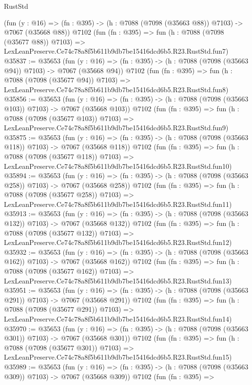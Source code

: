 \begin{lexlean}{RustStd}
\begin{coremodule}
    (fun (y : @16) => (fn : @395) -> (h : @7088 (@7098 (@35663 @88)) @7103) -> @7067 (@35668 @88))
    @7102
    (fun (fn : @395) =>
    fun (h : @7088 (@7098 (@35677 @88)) @7103) =>
    LexLeanPreserve.Ce74c78a8f5b611b9db7be15416dcd6b5.R23.RustStd.fun7)
@35837 := @35653
    (fun (y : @16) => (fn : @395) -> (h : @7088 (@7098 (@35663 @94)) @7103) -> @7067 (@35668 @94))
    @7102
    (fun (fn : @395) =>
    fun (h : @7088 (@7098 (@35677 @94)) @7103) =>
    LexLeanPreserve.Ce74c78a8f5b611b9db7be15416dcd6b5.R23.RustStd.fun8)
@35856 := @35653
    (fun (y : @16) => (fn : @395) -> (h : @7088 (@7098 (@35663 @103)) @7103) -> @7067 (@35668 @103))
    @7102
    (fun (fn : @395) =>
    fun (h : @7088 (@7098 (@35677 @103)) @7103) =>
    LexLeanPreserve.Ce74c78a8f5b611b9db7be15416dcd6b5.R23.RustStd.fun9)
@35875 := @35653
    (fun (y : @16) => (fn : @395) -> (h : @7088 (@7098 (@35663 @118)) @7103) -> @7067 (@35668 @118))
    @7102
    (fun (fn : @395) =>
    fun (h : @7088 (@7098 (@35677 @118)) @7103) =>
    LexLeanPreserve.Ce74c78a8f5b611b9db7be15416dcd6b5.R23.RustStd.fun10)
@35894 := @35653
    (fun (y : @16) => (fn : @395) -> (h : @7088 (@7098 (@35663 @258)) @7103) -> @7067 (@35668 @258))
    @7102
    (fun (fn : @395) =>
    fun (h : @7088 (@7098 (@35677 @258)) @7103) =>
    LexLeanPreserve.Ce74c78a8f5b611b9db7be15416dcd6b5.R23.RustStd.fun11)
@35913 := @35653
    (fun (y : @16) => (fn : @395) -> (h : @7088 (@7098 (@35663 @132)) @7103) -> @7067 (@35668 @132))
    @7102
    (fun (fn : @395) =>
    fun (h : @7088 (@7098 (@35677 @132)) @7103) =>
    LexLeanPreserve.Ce74c78a8f5b611b9db7be15416dcd6b5.R23.RustStd.fun12)
@35932 := @35653
    (fun (y : @16) => (fn : @395) -> (h : @7088 (@7098 (@35663 @162)) @7103) -> @7067 (@35668 @162))
    @7102
    (fun (fn : @395) =>
    fun (h : @7088 (@7098 (@35677 @162)) @7103) =>
    LexLeanPreserve.Ce74c78a8f5b611b9db7be15416dcd6b5.R23.RustStd.fun13)
@35951 := @35653
    (fun (y : @16) => (fn : @395) -> (h : @7088 (@7098 (@35663 @291)) @7103) -> @7067 (@35668 @291))
    @7102
    (fun (fn : @395) =>
    fun (h : @7088 (@7098 (@35677 @291)) @7103) =>
    LexLeanPreserve.Ce74c78a8f5b611b9db7be15416dcd6b5.R23.RustStd.fun14)
@35970 := @35653
    (fun (y : @16) => (fn : @395) -> (h : @7088 (@7098 (@35663 @301)) @7103) -> @7067 (@35668 @301))
    @7102
    (fun (fn : @395) =>
    fun (h : @7088 (@7098 (@35677 @301)) @7103) =>
    LexLeanPreserve.Ce74c78a8f5b611b9db7be15416dcd6b5.R23.RustStd.fun15)
@35989 := @35653
    (fun (y : @16) => (fn : @395) -> (h : @7088 (@7098 (@35663 @309)) @7103) -> @7067 (@35668 @309))
    @7102
    (fun (fn : @395) =>

\end{coremodule}
\end{lexlean}
